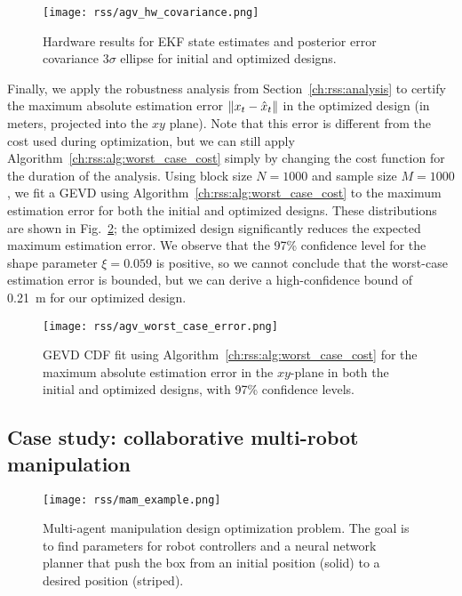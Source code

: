 \begin{figure}[tb]
    \centering
    \texttt{[image: rss/agv\_hw\_covariance.png]}
    \caption{Hardware results for EKF state estimates and posterior error covariance $3\sigma$ ellipse for initial and optimized designs.}
    \label{ch:rss:fig:agv_hw_cov}
\end{figure}

Finally, we apply the robustness analysis from Section~\ref{ch:rss:analysis} to certify the maximum absolute estimation error $\left\lVert x_t - \hat{x}_t\right\rVert$ in the optimized design (in meters, projected into the $xy$ plane). Note that this error is different from the cost used during optimization, but we can still apply Algorithm~\ref{ch:rss:alg:worst_case_cost} simply by changing the cost function for the duration of the analysis. Using block size $N = 1000$ and sample size $M = 1000$, we fit a GEVD using Algorithm~\ref{ch:rss:alg:worst_case_cost} to the maximum estimation error for both the initial and optimized designs. These distributions are shown in Fig.~\ref{ch:rss:fig:agv_gevd}; the optimized design significantly reduces the expected maximum estimation error. We observe that the 97\% confidence level for the shape parameter $\xi = 0.059$ is positive, so we cannot conclude that the worst-case estimation error is bounded, but we can derive a high-confidence bound of \SI{0.21}{m} for our optimized design.

\begin{figure}[t]
    \centering
    \texttt{[image: rss/agv\_worst\_case\_error.png]}
    \caption{GEVD CDF fit using Algorithm~\ref{ch:rss:alg:worst_case_cost} for the maximum absolute estimation error in the $xy$-plane in both the initial and optimized designs, with 97\% confidence levels.}
    \label{ch:rss:fig:agv_gevd}
\end{figure}

\subsection{Case study: collaborative multi-robot manipulation}\label{ch:rss:case2}

\begin{figure}[b!]
    \centering
    \texttt{[image: rss/mam\_example.png]}
    \caption{Multi-agent manipulation design optimization problem. The goal is to find parameters for robot controllers and a neural network planner that push the box from an initial position (solid) to a desired position (striped).}
    \label{ch:rss:fig:mam_example}
\end{figure}

